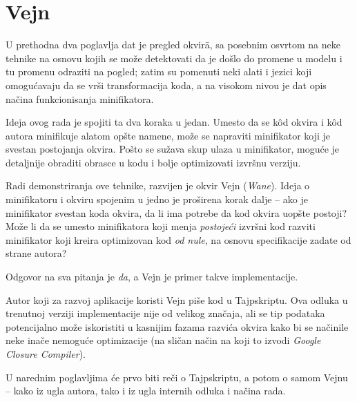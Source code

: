\section{Vejn}

U prethodna dva poglavlja dat je pregled okvir\=a, sa posebnim osvrtom na neke tehnike na osnovu kojih se može detektovati da je došlo do promene u modelu i tu promenu odraziti na pogled; zatim su pomenuti neki alati i jezici koji omogućavaju da se vrši transformacija koda, a na visokom nivou je dat opis načina funkcionisanja minifikatora.

Ideja ovog rada je spojiti ta dva koraka u jedan.
Umesto da se kôd okvira i kôd autora minifikuje alatom opšte namene, može se napraviti minifikator koji je svestan postojanja okvira.
Pošto se sužava skup ulaza u minifikator, moguće je detaljnije obraditi obrasce u kodu i bolje optimizovati izvršnu verziju.

Radi demonstriranja ove tehnike, razvijen je okvir Vejn (\textsl{Wane}).
Ideja o minifikatoru i okviru spojenim u jedno je proširena korak dalje -- ako je minifikator svestan koda okvira, da li ima potrebe da kod okvira uopšte postoji?
Može li da se umesto minifikatora koji menja \emph{postojeći} izvršni kod razviti minifikator koji kreira optimizovan kod \emph{od nule}, na osnovu specifikacije zadate od strane autora?

Odgovor na sva pitanja je \emph{da}, a Vejn je primer takve implementacije.

Autor koji za razvoj aplikacije koristi Vejn piše kod u Tajpskriptu.
Ova odluka u trenutnoj verziji implementacije nije od velikog značaja, ali se tip podataka potencijalno može iskoristiti u kasnijim fazama razvića okvira kako bi se načinile neke inače nemoguće optimizacije (na sličan način na koji to izvodi \textsl{Google Closure Compiler}).

U narednim poglavljima će prvo biti reči o Tajpskriptu, a potom o samom Vejnu -- kako iz ugla autora, tako i iz ugla internih odluka i načina rada.
